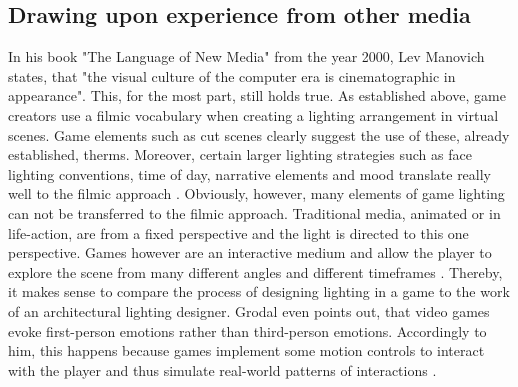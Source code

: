 \subsection{Drawing upon experience from other media}
In his book "The Language of New Media" from the year 2000, Lev Manovich states, that "the visual culture of the computer era is cinematographic in appearance". This, for the most part, still holds true. As established above, game creators use a filmic vocabulary when creating a lighting arrangement in virtual scenes. Game elements such as cut scenes clearly suggest the use of these, already established, therms. Moreover, certain larger lighting strategies such as face lighting conventions, time of day, narrative elements and mood translate really well to the filmic approach \cite{Shadowplay}. Obviously, however, many elements of game lighting can not be transferred to the filmic approach. Traditional media, animated or in life-action, are from a fixed perspective and the light is directed to this one perspective. Games however are an interactive medium and allow the player to explore the scene from many different angles and different timeframes \cite{Maggi.2006}. Thereby, it makes sense to compare the process of designing lighting in a game to the work of an architectural lighting designer. Grodal even points out, that video games evoke first-person emotions rather than third-person emotions. Accordingly to him, this happens because games implement some motion controls to interact with the player and thus simulate real-world patterns of interactions \cite{Grodal}. 
\newpage
